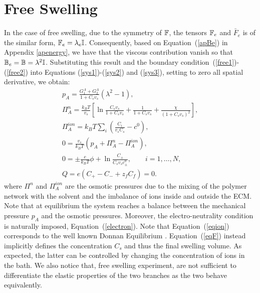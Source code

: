 \section{Free Swelling}
\label{apfree}
In the case of free swelling, due to the symmetry of $\mathbb{F}$, the tensors $\mathbb{F}_e$ and $\bar{F}_e$ is of the similar form, $\mathbb{F}_e=\lambda_e \mathbb{I}$. Consequently, based on Equation~(\ref{apBe}) in Appendix \ref{apenergy}, we have that the viscous contribution vanish so that $\mathbb{B}_e=\mathbb{B}= \lambda^2 \mathbb{I}$. Substituting this result and the boundary condition~(\ref{free1})-(\ref{free2}) into Equations (\ref{sys1})-(\ref{sys2}) and (\ref{sys3}), setting to zero all spatial derivative, we obtain:
\begin{gather}
p_A = \frac{G^A_1+G^A_2}{1+C_sv_s}(\lambda^2-1),\label{presA}\\
\Pi^{n}_A = \frac{k_BT}{v_s} \left[\ln \frac{C_s v_s}{1+C_s v_s} + \frac{1}{1+C_sv_s} +\frac{\chi}{(1+C_s v_s)^2}\right],\\
\Pi^{ion}_A = k_B T \sum_i \left(\frac{C_i}{v_sC_s}-c^0\right),\\
0 = \frac{v_s}{k_BT} (p_A+\Pi^{n}_A-\Pi^{ion}_A), \\[2mm]
0 = \pm\frac{e}{k_B T} \phi  + \ln \frac{C_\pm}{C_s v_s c_\pm^0},\qquad i=1,\ldots,N,\\[2.5mm]
Q = e\left(C_+-C_-+z_f C_{f}\right)=0.\label{electron}
\end{gather}
where $\Pi^{n}$ and $\Pi^{ion}_A$ are the osmotic pressures due to the mixing of the polymer network with the solvent and the imbalance of ions inside and outside the ECM. 
Note that at equilibrium the system reaches a balance between the mechanical pressure $p_A$ and the osmotic pressures. Moreover, the electro-neutrality condition is naturally imposed, Equation~(\ref{electron}). 
Note that Equation~(\ref{eqion}) corresponds to the well known Donnan Equilibrium \cite{DROZDOVph}. Equation~(\ref{eqF}) instead implicitly defines the concentration $C_s$ and thus the final swelling volume. As expected, the latter can be controlled by changing the concentration of ions in the bath. We also notice that, free swelling experiment, are not sufficient to differentiate the elastic properties of the two branches as the two behave equivalently.